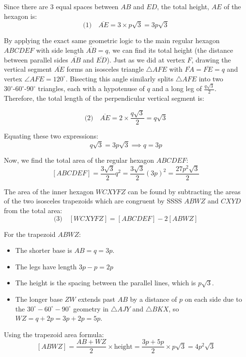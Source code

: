 \begin{enumerate}
 
Since there are $3$ equal spaces between $AB$ and $ED$, the total height, $AE$ of the hexagon is:
 \[\text{(1)} \quad \overline{AE} = 3 \times p\sqrt{3} = 3p\sqrt{3}\]

 By applying the exact same geometric logic to the main regular hexagon \(ABCDEF\) with side length \(\overline{AB} = q\), we can find its total height (the distance between parallel sides \(\overline{AB}\) and \(\overline{ED}\)). Just as we did at vertex \(F\), drawing the vertical segment \(\overline{AE}\) forms an isosceles triangle \(\triangle AFE\) with \(\overline{FA} = \overline{FE} = q\) and vertex \(\angle AFE = 120^\circ\). Bisecting this angle similarly splits \(\triangle AFE\) into two \(30^\circ\text{-}60^\circ\text{-}90^\circ\) triangles, each with a hypotenuse of \(q\) and a long leg of \(\frac{q\sqrt{3}}{2}\). Therefore, the total length of the perpendicular vertical segment is:

 
 \[\text{(2)} \quad \overline{AE} = 2 \times \frac{q\sqrt{3}}{2} = q\sqrt{3}\]

 Equating these two expressions:
 \[q\sqrt{3} = 3p\sqrt{3} \implies q = 3p\]

 Now, we find the total area of the regular hexagon $ABCDEF$:
 \[[ABCDEF] = \frac{3\sqrt{3}}{2}q^2 = \frac{3\sqrt{3}}{2}(3p)^2 = \frac{27p^2\sqrt{3}}{2}\]

 The area of the inner hexagon $WCXYFZ$ can be found by subtracting the areas of the two isosceles trapezoids which are congruent by SSSS $ABWZ$ and $CXYD$ from the total area:
 \[\text{(3)} \quad [WCXYFZ] = [ABCDEF] - 2[ABWZ]\]

 For the trapezoid $ABWZ$:

 
            \begin{itemize}
        \item The shorter base is $AB = q = 3p$.
        \item The legs have length $3p - p = 2p$
        \item The height is the spacing between the parallel lines, which is $p\sqrt{3}$.
        \item The longer base $ZW$ extends past $AB$ by a distance of $p$ on each side due to the $30^\circ-60^\circ-90^\circ$ geometry in $\triangle AJY$ and $\triangle BKX$, so $WZ = q + 2p = 3p + 2p = 5p$.
            \end{itemize}
            Using the trapezoid area formula:
 \[[ABWZ] = \frac{AB + WZ}{2} \times \text{height} = \frac{3p + 5p}{2} \times p\sqrt{3} = 4p^2\sqrt{3}\]


\end{enumerate}
